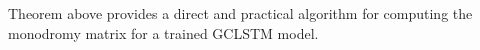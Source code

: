 \documentclass{article}
\theoremstyle{remark}
\theoremstyle{definition}
\begin{document}
Theorem above provides a direct and practical algorithm for computing the monodromy matrix for a trained GCLSTM model. 




\end{document}
